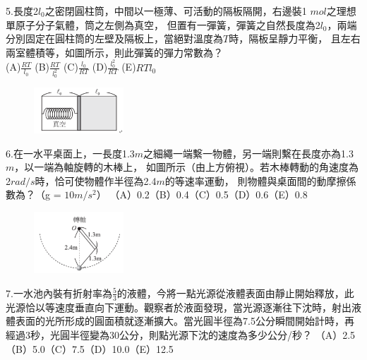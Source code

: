 \documentclass[cn,10pt,math=newtx]{elegantbook}
\begin{document}
\newpage

\begin{example}
   5.長度2$l_0$之密閉圓柱筒，中間以一極薄、可活動的隔板隔開，右邊裝1 $mol$之理想單原子分子氣體，筒之左側為真空，
   但置有一彈簧，彈簧之自然長度為2$l_0$，兩端分別固定在圓柱筒的左壁及隔板上，當絕對溫度為$T$時，隔板呈靜力平衡，
   且左右兩室體積等，如圖所示，則此彈簧的彈力常數為？\\
   (A)$\frac{RT}{l_0}$ (B)$\frac{RT}{l_0^2}$ (C)$\frac{l_0}{RT}$ (D)$\frac{l_0^2}{RT}$ (E)$RTl_0$\\
    \rightline{[成德高中教甄109]}
\end{example}
\begin{solution}
    
\end{solution}
\begin{figure}[htbp]
    \flushright
    \includegraphics[width=0.3\textwidth]{image/109成德5.png}
  \end{figure}
\newpage


\begin{example}
   6.在一水平桌面上，一長度1.3$m$之細繩一端繫一物體，另一端則繫在長度亦為1.3$m$，以一端為軸旋轉的木棒上，
   如圖所示（由上方俯視）。若木棒轉動的角速度為2$rad/s$時，恰可使物體作半徑為2.4$m$的等速率運動，
   則物體與桌面間的動摩擦係數為？（g = $10m/s^2$）
   （A）0.2（B）0.4（C）0.5（D）0.6（E）0.8\\
    \rightline{[成德高中教甄109]}
\end{example}
\begin{solution}
    
\end{solution}
\begin{figure}[htbp]
    \flushright
    \includegraphics[width=0.3\textwidth]{image/109成德6.png}
  \end{figure}
\newpage

\begin{example}
   7.一水池內裝有折射率為$\frac{5}{3}$的液體，今將一點光源從液體表面由靜止開始釋放，此光源恰以等速度垂直向下運動。觀察者於液面發現，當光源逐漸往下沈時，射出液體表面的光所形成的圓面積就逐漸擴大。當光圓半徑為7.5公分瞬間開始計時，再經過3秒，光圓半徑變為30公分，則點光源下沈的速度為多少公分/秒？
   （A）2.5（B）5.0（C）7.5（D）10.0（E）12.5
   \\
    \rightline{[成德高中教甄109]}
\end{example}
\begin{solution}
    
\end{solution}
\end{document}
